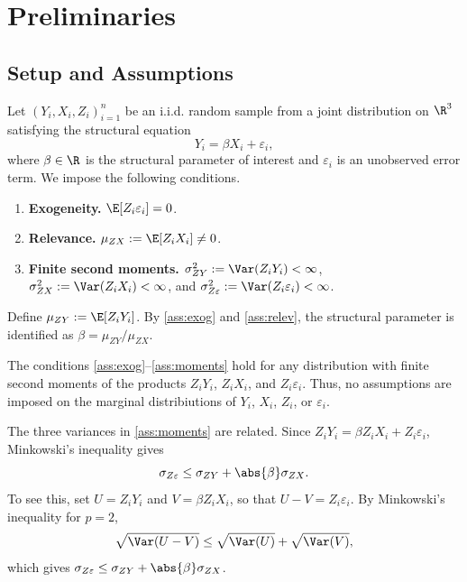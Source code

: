 \section{Preliminaries}

\subsection{Setup and Assumptions}
Let $(Y_i, X_i, Z_i)_{i=1}^{n}$ be an i.i.d. random sample from a joint distribution on $\R^3$ satisfying the structural equation
\begin{equation}
\label{eq:structural}
    Y_i = \beta X_i + \varepsilon_i,
\end{equation}
where $\beta \in \R$ is the structural parameter of interest and $\varepsilon_i$ is an unobserved error term. We impose the following conditions.

\begin{enumerate}[label=(A\arabic*)]
    \item \label{ass:exog} \textbf{Exogeneity.} $\E[Z_i \varepsilon_i] = 0$.
    \item \label{ass:relev} \textbf{Relevance.} $\mu_{ZX} := \E[Z_i X_i] \neq 0$.
    \item \label{ass:moments} \textbf{Finite second moments.} $\sigma_{ZY}^2 := \Var(Z_i Y_i) < \infty$, $\sigma_{ZX}^2 := \Var(Z_i X_i) < \infty$, and $\sigma_{Z\varepsilon}^2 := \Var(Z_i \varepsilon_i) < \infty$.
\end{enumerate}

Define $\mu_{ZY} := \E[Z_i Y_i]$. By \ref{ass:exog} and \ref{ass:relev}, the structural parameter is identified as $\beta = \mu_{ZY}/\mu_{ZX}$.

\begin{remark}
The conditions \ref{ass:exog}--\ref{ass:moments} hold for any distribution with finite second moments of the products $Z_iY_i$, $Z_iX_i$, and $Z_i\varepsilon_i$. Thus, no assumptions are imposed on the marginal distribiutions of $Y_i$, $X_i$, $Z_i$, or $\varepsilon_i$.
\end{remark}

\begin{remark}
\label{rem:minkowski}
The three variances in \ref{ass:moments} are related. Since $Z_i Y_i = \beta Z_i X_i + Z_i\varepsilon_i$, Minkowski's inequality gives
\begin{equation}
\label{eq:minkowski}
    \sigma_{Z\varepsilon} \leq \sigma_{ZY} + \abs{\beta}\sigma_{ZX}.
\end{equation}
To see this, set $U = Z_i Y_i$ and $V = \beta Z_i X_i$, so that $U - V = Z_i\varepsilon_i$. By Minkowski's inequality for $p = 2$,
\[
    \sqrt{\Var(U - V)} \leq \sqrt{\Var(U)} + \sqrt{\Var(V)},
\]
which gives $\sigma_{Z\varepsilon} \leq \sigma_{ZY} + \abs{\beta}\sigma_{ZX}$.
\end{remark}


